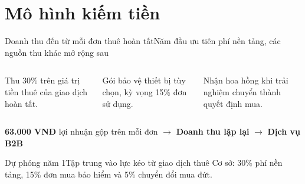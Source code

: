 \section{Mô hình kiếm tiền}

\begin{frame}{Doanh thu đến từ mỗi đơn thuê hoàn tất}{Năm đầu ưu tiên phí nền tảng, các nguồn thu khác mở rộng sau}
  \vspace{.8em}
  \begin{columns}[T,onlytextwidth]
      \par\vspace{.45em}
      Thu 30\% trên giá trị tiền thuê của giao dịch hoàn tất.
      \par\vspace{.45em}
      Gói bảo vệ thiết bị tùy chọn, kỳ vọng 15\% đơn sử dụng.
      \par\vspace{.45em}
      Nhận hoa hồng khi trải nghiệm chuyển thành quyết định mua.
  \end{columns}
  \vfill
  \centering\textbf{63.000 VNĐ} lợi nhuận gộp trên mỗi đơn $\rightarrow$ \textbf{Doanh thu lặp lại} $\rightarrow$ \textbf{Dịch vụ B2B}
\end{frame}

\begin{frame}{Dự phóng năm 1}{Tập trung vào lực kéo từ giao dịch thuê}
  \vspace{1.2em}
  \centering
  \vfill
  \centering\small\color{cookieMuted}
  Cơ sở: 30\% phí nền tảng, 15\% đơn mua bảo hiểm và 5\% chuyển đổi mua đứt.
\end{frame}

